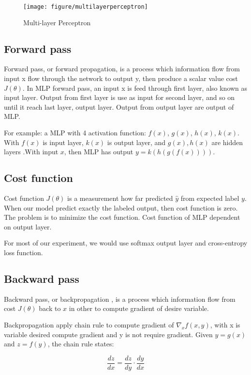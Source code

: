 \begin{figure}[H]
	\centering
	\texttt{[image: figure/multilayerperceptron]}
	\caption[Multi-layer Perceptron]{Multi-layer Perceptron}
	\label{fig:multilayerperceptron}
\end{figure}

\subsection{Forward pass}
Forward pass, or forward propagation, is a process which information flow from input x flow through the network to output y, then produce a scalar value cost $J(\theta)$. In MLP forward pass, an input x is feed through first layer, also known as input layer. Output from first layer is use as input for second layer, and so on until it reach last layer, output layer. Output from output layer are output of MLP.

For example: a MLP with 4 activation function: $f(x)$, $g(x)$, $h(x)$, $k(x)$. With $f(x)$ is input layer, $k(x)$ is output layer, and $g(x), h(x)$ are hidden layers .With input $x$, then MLP has output $ y = k(h(g(f(x))))$.

\subsection{Cost function}
Cost function $J(\theta)$  is a measurement how far predicted  $\hat y$ from expected label $y$. When our model predict exactly the labeled output, then cost function is zero. The problem is to minimize the cost function. Cost function of MLP dependent on output layer.

For most of our experiment, we would use softmax output layer and cross-entropy loss function.

\subsection{Backward pass}
Backward pass, or backpropagation \cite{rumelhart1988learning}, is a process which information flow from cost $J(\theta)$ back to $x$ in other to compute gradient of desire variable.

Backpropagation apply chain rule to compute gradient of $\nabla_xf(x, y)$, with x is variable desired compute gradient and y is not require gradient. Given $y = g(x)$ and $z = f(y)$, the chain rule states:

\begin{equation} \label{eq:chainrule}
{\frac  {dz}{dx}}={\frac  {dz}{dy}}\cdot {\frac  {dy}{dx}}
\end{equation}

